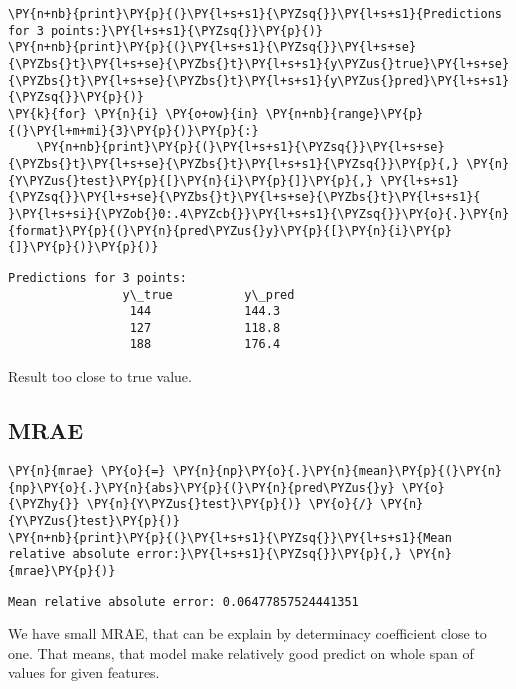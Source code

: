     \begin{tcolorbox}[breakable, size=fbox, boxrule=1pt, pad at break*=1mm,colback=cellbackground, colframe=cellborder]
\begin{Verbatim}[commandchars=\\\{\}]
\PY{n+nb}{print}\PY{p}{(}\PY{l+s+s1}{\PYZsq{}}\PY{l+s+s1}{Predictions for 3 points:}\PY{l+s+s1}{\PYZsq{}}\PY{p}{)}
\PY{n+nb}{print}\PY{p}{(}\PY{l+s+s1}{\PYZsq{}}\PY{l+s+se}{\PYZbs{}t}\PY{l+s+se}{\PYZbs{}t}\PY{l+s+s1}{y\PYZus{}true}\PY{l+s+se}{\PYZbs{}t}\PY{l+s+se}{\PYZbs{}t}\PY{l+s+s1}{y\PYZus{}pred}\PY{l+s+s1}{\PYZsq{}}\PY{p}{)}
\PY{k}{for} \PY{n}{i} \PY{o+ow}{in} \PY{n+nb}{range}\PY{p}{(}\PY{l+m+mi}{3}\PY{p}{)}\PY{p}{:}
    \PY{n+nb}{print}\PY{p}{(}\PY{l+s+s1}{\PYZsq{}}\PY{l+s+se}{\PYZbs{}t}\PY{l+s+se}{\PYZbs{}t}\PY{l+s+s1}{\PYZsq{}}\PY{p}{,} \PY{n}{Y\PYZus{}test}\PY{p}{[}\PY{n}{i}\PY{p}{]}\PY{p}{,} \PY{l+s+s1}{\PYZsq{}}\PY{l+s+se}{\PYZbs{}t}\PY{l+s+se}{\PYZbs{}t}\PY{l+s+s1}{ }\PY{l+s+si}{\PYZob{}0:.4\PYZcb{}}\PY{l+s+s1}{\PYZsq{}}\PY{o}{.}\PY{n}{format}\PY{p}{(}\PY{n}{pred\PYZus{}y}\PY{p}{[}\PY{n}{i}\PY{p}{]}\PY{p}{)}\PY{p}{)}
\end{Verbatim}
\end{tcolorbox}

    \begin{Verbatim}[commandchars=\\\{\}]
Predictions for 3 points:
                y\_true          y\_pred
                 144             144.3
                 127             118.8
                 188             176.4
    \end{Verbatim}

Result too close to true value.

\subsection*{MRAE}

    \begin{tcolorbox}[breakable, size=fbox, boxrule=1pt, pad at break*=1mm,colback=cellbackground, colframe=cellborder]
\begin{Verbatim}[commandchars=\\\{\}]
\PY{n}{mrae} \PY{o}{=} \PY{n}{np}\PY{o}{.}\PY{n}{mean}\PY{p}{(}\PY{n}{np}\PY{o}{.}\PY{n}{abs}\PY{p}{(}\PY{n}{pred\PYZus{}y} \PY{o}{\PYZhy{}} \PY{n}{Y\PYZus{}test}\PY{p}{)} \PY{o}{/} \PY{n}{Y\PYZus{}test}\PY{p}{)}
\PY{n+nb}{print}\PY{p}{(}\PY{l+s+s1}{\PYZsq{}}\PY{l+s+s1}{Mean relative absolute error:}\PY{l+s+s1}{\PYZsq{}}\PY{p}{,} \PY{n}{mrae}\PY{p}{)}
\end{Verbatim}
\end{tcolorbox}

    \begin{Verbatim}[commandchars=\\\{\}]
Mean relative absolute error: 0.06477857524441351
    \end{Verbatim}

We have small MRAE, that can be explain by determinacy coefficient close to one. That means, that model make relatively good predict on whole span of values for given features.
